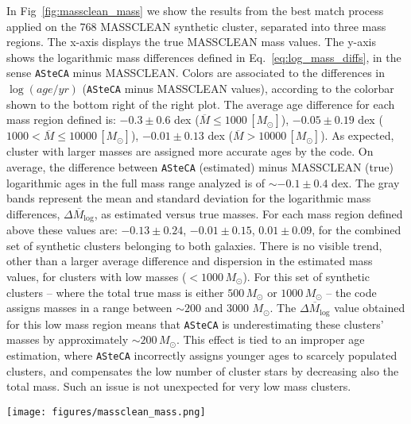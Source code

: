 \documentclass[draft]{aa}
\begin{document}
\begin{appendix}
In Fig~\ref{fig:massclean_mass} we show the results from the best match process
applied on the 768 MASSCLEAN synthetic cluster, separated into three mass
regions. The x-axis displays the true MASSCLEAN mass values. The y-axis shows
the logarithmic mass differences defined in Eq.~\ref{eq:log_mass_diffs}, in the
sense \texttt{ASteCA} minus MASSCLEAN.
%
Colors are associated to the differences in $\log(age/yr)$
(\texttt{ASteCA} minus MASSCLEAN values), according to the colorbar shown to the
bottom right of the right plot. The average age difference for each mass
region defined is: 
$-0.3{\pm}0.6$ dex ($\overline{M}{\le}1000\,[M_{\odot}]$),
$-0.05{\pm}0.19$ dex ($1000{<}\overline{M}{\le}10000\,[M_{\odot}]$),
$-0.01{\pm}0.13$ dex ($\overline{M}{>}10000\,[M_{\odot}]$). As expected, cluster
with larger masses are assigned more accurate ages by the code.
On average, the difference between \texttt{ASteCA} (estimated) minus MASSCLEAN 
(true) logarithmic ages in the full mass range analyzed is of ${\sim}-0.1
{\pm}0.4$ dex.
%
The gray bands represent the mean and standard deviation for the logarithmic
mass differences, $\overline{\Delta M_{\log}}$, as estimated versus true
masses. For each mass region defined above these values are: $-0.13{\pm}0.24$,
$-0.01{\pm}0.15$, $0.01{\pm}0.09$, for the combined set of synthetic clusters
belonging to both galaxies.
%
There is no visible trend, other than a larger average difference and dispersion
in the estimated mass values, for clusters with low masses
(${<}1000\,M_{\odot}$). For this set of synthetic clusters -- where the total
true mass is either $500\,M_{\odot}$ or $1000\,M_{\odot}$ -- the code assigns
masses in a range between ${\sim}200$ and 3000 $M_{\odot}$.
The $\overline{\Delta M_{\log}}$ value obtained for this low mass region means
that \texttt{ASteCA} is underestimating these clusters' masses by approximately
${\sim}200\,M_{\odot}$. This effect is tied to an improper age estimation,
where \texttt{ASteCA} incorrectly assigns younger ages to scarcely populated
clusters, and compensates the low number of cluster stars by decreasing also the
total mass. Such an issue is not unexpected for very low mass clusters.

\begin{figure*}
\texttt{[image: figures/massclean\_mass.png]}
\caption{Recovered masses by \texttt{ASteCA} for the set of 768 MASSCLEAN
synthetic clusters, separated in three mass ranges.
Logarithmic mass differences $\Delta M_{\log}$ are obtained in the sense
\texttt{ASteCA} minus MASSCLEAN (i.e., estimated minus true values), and shown
in the y-axis. MASSCLEAN masses in the x-axis are perturbed with a small
random scatter to improve visibility.}
\label{fig:massclean_mass}
\end{figure*}


\end{appendix}
\end{document}
